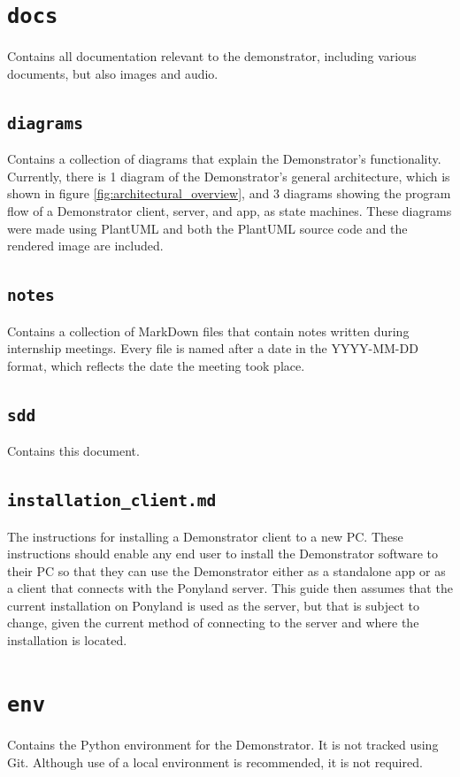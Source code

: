 \section{\texttt{docs}}
Contains all documentation relevant to the demonstrator, including various documents, but also images and audio.

\subsection{\texttt{diagrams}}
Contains a collection of diagrams that explain the Demonstrator's functionality.
Currently, there is 1 diagram of the Demonstrator's general architecture, which is shown in figure \ref{fig:architectural_overview}, and 3 diagrams showing the program flow of a Demonstrator client, server, and app, as state machines.
These diagrams were made using PlantUML and both the PlantUML source code and the rendered image are included.

\subsection{\texttt{notes}}
Contains a collection of MarkDown files that contain notes written during internship meetings.
Every file is named after a date in the YYYY-MM-DD format, which reflects the date the meeting took place.

\subsection{\texttt{sdd}}
Contains this document.

\subsection{\texttt{installation\_client.md}}
The instructions for installing a Demonstrator client to a new PC.
These instructions should enable any end user to install the Demonstrator software to their PC so that they can use the Demonstrator either as a standalone app or as a client that connects with the Ponyland server.
This guide then assumes that the current installation on Ponyland is used as the server, but that is subject to change, given the current method of connecting to the server and where the installation is located.

\section{\texttt{env}}
Contains the Python environment for the Demonstrator.
It is not tracked using Git.
Although use of a local environment is recommended, it is not required.

